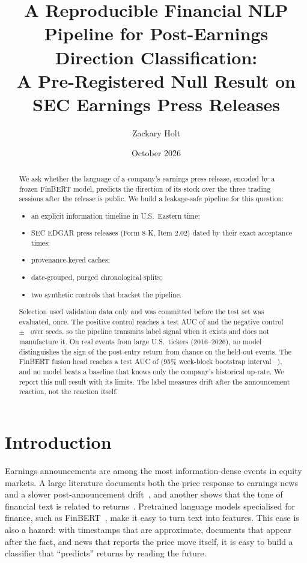 \documentclass[11pt]{article}
\title{A Reproducible Financial NLP Pipeline for Post-Earnings Direction Classification:\\
A Pre-Registered Null Result on SEC Earnings Press Releases}
\author{Zackary Holt}
\date{October 2026}
\begin{document}
\maketitle

\begin{abstract}
We ask whether the language of a company's earnings press release, encoded by a frozen
FinBERT model, predicts the direction of its stock over the three trading sessions after the
release is public. We build a leakage-safe pipeline for this question:
\begin{itemize}
  \item an explicit information timeline in U.S.\ Eastern time;
  \item SEC EDGAR press releases (Form 8-K, Item 2.02) dated by their exact acceptance times;
  \item provenance-keyed caches;
  \item date-grouped, purged chronological splits;
  \item two synthetic controls that bracket the pipeline.
\end{itemize}
Selection used validation data only and was committed before the test set was evaluated,
once. The positive control reaches a test AUC of \posMean{} and the negative control
\negMean{}~$\pm$~\negSd{} over \ctlRuns{} seeds, so the pipeline transmits label signal when
it exists and does not manufacture it. On \nEvents{} real events from \nTickers{} large U.S.\
tickers (2016--2026), no model distinguishes the sign of the post-entry return from chance on
the \nTest{} held-out events. The FinBERT fusion head reaches a test AUC of \testHead{}
(95\% week-block bootstrap interval \loHead--\hiHead), and no model beats a baseline that knows
only the company's historical up-rate. We report this null result with its limits. The label
measures drift after the announcement reaction, not the reaction itself.
\end{abstract}

\section{Introduction}
Earnings announcements are among the most information-dense events in equity markets. A
large literature documents both the price response to earnings news and a slower
post-announcement drift~\citep{ball1968,bernard1989}, and another shows that the tone of
financial text is related to returns~\citep{tetlock2007,tetlock2008,loughran2011,ke2019}.
Pretrained language models specialised for finance, such as FinBERT~\citep{araci2019}, make it
easy to turn text into features. This ease is also a hazard: with timestamps that are
approximate, documents that appear after the fact, and news that reports the price move
itself, it is easy to build a classifier that ``predicts'' returns by reading the future.
\end{document}
